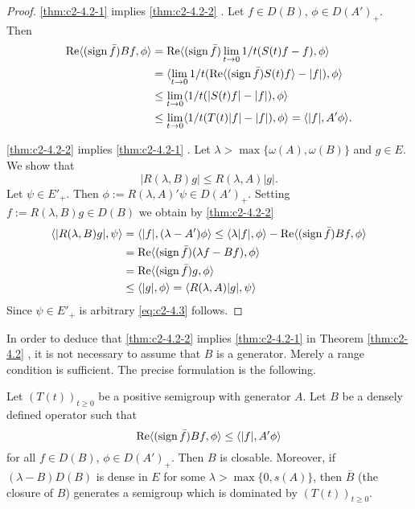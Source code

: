\begin{proof}
\ref{thm:c2-4.2-1}   implies \ref{thm:c2-4.2-2}  . Let $f \in D(B)$, $\phi \in D(A')_{+}$. Then
\begin{align*}
\mathop{}\!\mathrm{Re}\langle(\operatorname{sign}  \bar{f})Bf, \phi\rangle &= \mathop{}\!\mathrm{Re}  \langle(\operatorname{sign}  \bar{f})\lim_{t \to 0}1/t(S(t)f - f),\phi\rangle\\
&= \langle\lim_{t \to 0}1/t(\mathop{}\!\mathrm{Re}\langle(\operatorname{sign}  \bar{f}) S(t)f\rangle - |f|),\phi\rangle\\
&\leq \lim_{t \to 0}\langle 1/t(|S(t)f| - |f|),\phi\rangle\\
&\leq \lim_{t \to 0}\langle 1/t(T(t)|f| - |f|),\phi\rangle = \langle|f|,A'\phi\rangle.
\end{align*}

\ref{thm:c2-4.2-2}   implies \ref{thm:c2-4.2-1}  . 
Let $\lambda > \max\{\omega (A),\omega (B)\}$ and $g \in E$. 
We show that
\begin{equation}\label{eq:c2-4.3}
|R(\lambda,B)g| \leq R(\lambda,A)|g|.
\end{equation}
Let $\psi \in E'_{+}$. Then $\phi := R(\lambda,A)'\psi \in D(A')_{+}$.
Setting $f := R(\lambda,B)g \in D(B)$ we obtain by \ref{thm:c2-4.2-2}  
\begin{align*}
\langle|R(\lambda,B)g|,\psi\rangle &= \langle|f|,(\lambda-A')\phi\rangle \leq \langle\lambda|f|,\phi\rangle - \mathop{}\!\mathrm{Re}\langle(\operatorname{sign}  \bar{f})Bf,\phi\rangle\\
&= \mathop{}\!\mathrm{Re}\langle(\operatorname{sign}  \bar{f})(\lambda f - Bf),\phi\rangle \\
&= \mathop{}\!\mathrm{Re}\langle(\operatorname{sign}  \bar{f})g,\phi\rangle \\
&\leq \langle|g|,\phi\rangle = \langle R(\lambda,A)|g|,\psi\rangle
\end{align*}
Since $\psi \in E'_{+}$ is arbitrary \eqref{eq:c2-4.3} follows.
\end{proof}

In order to deduce that \ref{thm:c2-4.2-2}   implies \ref{thm:c2-4.2-1}   in Theorem \ref{thm:c2-4.2}  , it is not
necessary to assume that $B$ is a generator. 
Merely a range condition is sufficient. 
The precise formulation is the following.

\begin{theorem}\label{thm:c2-4.3}
Let $(T(t))_{t \geq 0}$ be a positive semigroup with generator $A$. 
Let $B$ be a densely defined operator such that
\begin{equation}\label{eq:c2-4.4}
\mathop{}\!\mathrm{Re}\langle(\operatorname{sign}  \bar{f})Bf,\phi\rangle \leq \langle|f|,A'\phi\rangle
\end{equation}
for all $f \in D(B)$, $\phi \in D(A')_{+}$.
Then $B$ is closable. 
Moreover, if $(\lambda - B)D(B)$ is dense in $E$ for some $\lambda > \max\{0,s(A)\}$, then $\overline{B}$ (the closure of $B$) generates a
semigroup which is dominated by $(T(t))_{t \geq 0}$.
\end{theorem}

